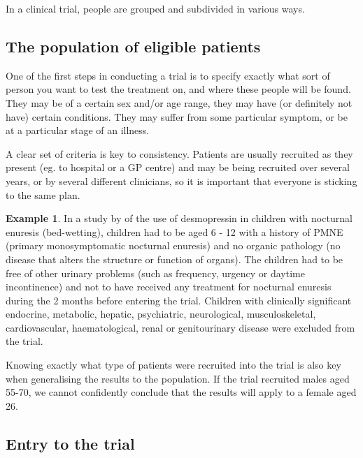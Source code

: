 \documentclass[
  openany]{book}
\theoremstyle{definition}
\theoremstyle{definition}
\newtheorem{example}{Example}[chapter]
\theoremstyle{definition}
\theoremstyle{definition}
\theoremstyle{remark}
\begin{document}
In a clinical trial, people are grouped and subdivided in various ways.

\subsection*{The population of eligible patients}\label{the-population-of-eligible-patients}

One of the first steps in conducting a trial is to specify exactly what sort of person you want to test the treatment on, and where these people will be found. They may be of a certain sex and/or age range, they may have (or definitely not have) certain conditions. They may suffer from some particular symptom, or be at a particular stage of an illness.

A clear set of criteria is key to consistency. Patients are usually recruited as they present (eg. to hospital or a GP centre) and may be being recruited over several years, or by several different clinicians, so it is important that everyone is sticking to the same plan.

\begin{example}
In a study by \citet{hjalmas1998enuresis} of the use of desmopressin in children with nocturnal enuresis (bed-wetting), children had to be aged 6 - 12 with a history of PMNE (primary monosymptomatic nocturnal enuresis) and no organic pathology (no disease that alters the structure or function of organs). The children had to be free of other urinary problems (such as frequency, urgency or daytime incontinence) and not to have received any treatment for nocturnal enuresis during the 2 months before entering the trial. Children with clinically significant endocrine,
metabolic, hepatic, psychiatric, neurological, musculoskeletal, cardiovascular, haematological, renal or genitourinary disease were excluded from the trial.
\end{example}

Knowing exactly what type of patients were recruited into the trial is also key when generalising the results to the population. If the trial recruited males aged 55-70, we cannot confidently conclude that the results will apply to a female aged 26.

\subsection*{Entry to the trial}\label{entry-to-the-trial}
\end{document}
